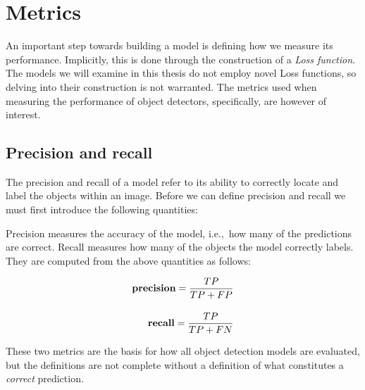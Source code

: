 \section{Metrics}

An important step towards building a model is defining how we measure its performance.
Implicitly, this is done through the construction of a \textit{Loss function}.
The models we will examine in this thesis do not employ novel Loss functions, so delving into their construction is not warranted.
The metrics used when measuring the performance of object detectors, specifically, are however of interest.

\subsection{Precision and recall}
The precision and recall of a model refer to its ability to correctly locate and label the objects within an image.
Before we can define precision and recall we must first introduce the following quantities:

\begin{center}
  {\setlength{\fboxsep}{1em}
  }
\end{center}

Precision measures the accuracy of the model, i.e.,~how many of the predictions are correct.
Recall measures how many of the objects the model correctly labels.
They are computed from the above quantities as follows:

\begin{align*}
  \text{\bf precision}=\frac{TP}{TP+FP}\\[1em]
  \text{\bf recall}=\frac{TP}{TP+FN}
\end{align*}

These two metrics are the basis for how all object detection models are evaluated, but the definitions are not complete without a definition of what constitutes a \textit{correct} prediction.

